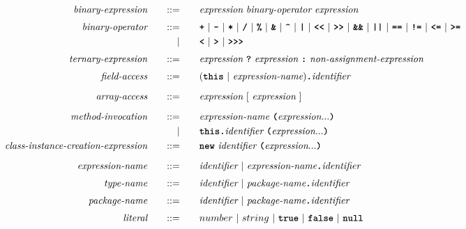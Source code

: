 \begin{alignat*}{9}
&& \textit{binary-expression}                    && \quad ::= & \quad && \textit{expression} \ \textit{binary-operator} \ \textit{expression} && \\[1mm]
&& \textit{binary-operator}                      && \quad ::= & \quad && \textbf{\texttt{+}} \ | \ \textbf{\texttt{-}} \ | \ \textbf{\texttt{*}} \ | \ \textbf{\texttt{/}} \ | \ \textbf{\texttt{\%}} \ | \ \textbf{\texttt{\&}} \ | \ \textbf{\texttt{\string^}} \ | \ \textbf{\texttt{|}} \ | \ \textbf{\texttt{<}}\textbf{\texttt{<}} \ | \ \textbf{\texttt{>}}\textbf{\texttt{>}} \ | \ \textbf{\texttt{\&\&}} \ | \ \textbf{\texttt{||}} \ | \ \textbf{\texttt{==}} \ | \ \textbf{\texttt{!=}} \ | \ \textbf{\texttt{<=}} \ | \ \textbf{\texttt{>=}} && \\
&&                                               &&         | & \quad && \textbf{\texttt{<}} \ | \ \textbf{\texttt{>}} \ | \ \textbf{\texttt{>}}\textbf{\texttt{>}}\textbf{\texttt{>}}  && \\[1mm]
&& \textit{ternary-expression}                    && \quad ::= & \quad && \textit{expression} \ \textbf{\texttt{?}} \ \textit{expression} \ \textbf{\texttt{:}} \  \textit{non-assignment-expression} && \\[1mm]
&& \textit{field-access}                         && \quad ::= & \quad && (\textbf{\texttt{this}} \ | \ \textit{expression-name})
 \textbf{\texttt{.}} 
  \textit{identifier} && \\[2mm]
&& \textit{array-access}                         && \quad ::= & \quad && \textit{expression} \ [ \ \textit{expression} \ ] && \\[2mm]
&& \textit{method-invocation}                    && \quad ::= & \quad && \textit{expression-name} \ \textbf{\texttt{(}} \textit{expression} ... \textbf{\texttt{)}} && \\
&&                                               &&         | & \quad && \textbf{\texttt{this}} \textbf{\texttt{.}} \textit{identifier} \ \textbf{\texttt{(}} \textit{expression} ... \textbf{\texttt{)}} && \\
&& \textit{class-instance-creation-expression}   && \quad ::= & \quad && \textbf{\texttt{new}} \ \textit{identifier} \ \textbf{\texttt{(}} \textit{expression} ... \textbf{\texttt{)}} && \\[2mm]
&& \textit{expression-name}                      && \quad ::= & \quad && \textit{identifier} \ | \ \textit{expression-name} \textbf{\texttt{.}} \textit{identifier} && \\[1mm]
&& \textit{type-name}                            && \quad ::= & \quad && \textit{identifier} \ | \ \textit{package-name} \textbf{\texttt{.}} \textit{identifier} && \\[1mm]
&& \textit{package-name}                         && \quad ::= & \quad && \textit{identifier} \ | \ \textit{package-name} \textbf{\texttt{.}} \textit{identifier} && \\[1mm]
&& \textit{literal}                              && \quad ::= & \quad && number \ | \ string \ | \ \textbf{\texttt{true}} \ | \ \textbf{\texttt{false}} \ | \ \textbf{\texttt{null}}&& \\[2mm]
\end{alignat*}
